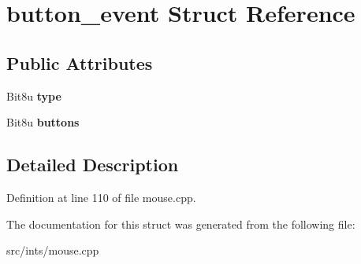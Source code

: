\hypertarget{structbutton__event}{\section{button\-\_\-event Struct Reference}
\label{structbutton__event}
}
\subsection*{Public Attributes}
\begin{DoxyCompactItemize}
\item 
\hypertarget{structbutton__event_a793d0b44cf9339bd85bd3d571830fa51}{Bit8u {\bfseries type}}\label{structbutton__event_a793d0b44cf9339bd85bd3d571830fa51}

\item 
\hypertarget{structbutton__event_abacaa182c19fa91de5e17ee325f6fe88}{Bit8u {\bfseries buttons}}\label{structbutton__event_abacaa182c19fa91de5e17ee325f6fe88}

\end{DoxyCompactItemize}


\subsection{Detailed Description}


Definition at line 110 of file mouse.\-cpp.



The documentation for this struct was generated from the following file\-:\begin{DoxyCompactItemize}
\item 
src/ints/mouse.\-cpp\end{DoxyCompactItemize}
